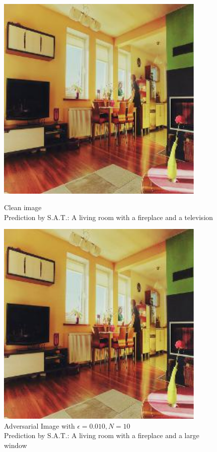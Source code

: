 \begin{figure}[ht]
    \centering
    \begin{minipage}{0.45\textwidth}
        \centering
        \includegraphics[width=0.9\textwidth]{../code/ShowDistractAndDeceive/samples/0.000/img_0.jpg} %
        \caption*{Clean image\\Prediction by S.A.T.: A living room with a fireplace and a television}
    \end{minipage}\hfill
    \begin{minipage}{0.45\textwidth}
        \centering
        \includegraphics[width=0.9\textwidth]{../code/ShowDistractAndDeceive/samples/0.010/img_0.jpg} %
        \caption*{Adversarial Image with $\epsilon=0.010, N=10$\\Prediction by S.A.T.: A living room with a fireplace and a large window}
    \end{minipage}
\end{figure}

